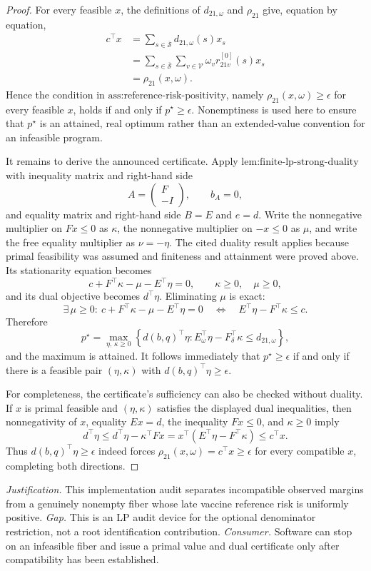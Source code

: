 \documentclass{article}
\begin{document}
\begin{proof}
For every feasible \(x\), the definitions of \(d_{21,\omega}\) and \(\rho_{21}\) give, equation by equation,
\[
 \begin{aligned}
 c^\top x
 &=\sum_{s\in\overline{\mathcal S}}d_{21,\omega}(s)x_s\\
 &=\sum_{s\in\overline{\mathcal S}}\sum_{v\in\mathcal V}
      \omega_v r^{[0]}_{21v}(s)x_s\\
 &=\rho_{21}(x,\omega).
 \end{aligned}
\]
Hence the condition in \(\text{ass:reference-risk-positivity}\), namely
\(\rho_{21}(x,\omega)\geq\epsilon\) for every feasible \(x\), holds if and only if \(p^\star\geq\epsilon\).  Nonemptiness is used here to ensure that \(p^\star\) is an attained, real optimum rather than an extended-value convention for an infeasible program.

It remains to derive the announced certificate.  Apply \(\text{lem:finite-lp-strong-duality}\) with inequality matrix and right-hand side
\[
 A=\begin{pmatrix}F\\-I\end{pmatrix},\qquad b_A=0,
\]
and equality matrix and right-hand side \(B=E\) and \(e=d\).  Write the nonnegative multiplier on \(Fx\leq0\) as \(\kappa\), the nonnegative multiplier on \(-x\leq0\) as \(\mu\), and write the free equality multiplier as \(\nu=-\eta\).  The cited duality result applies because primal feasibility was assumed and finiteness and attainment were proved above.  Its stationarity equation becomes
\[
 c+F^\top\kappa-\mu-E^\top\eta=0,
 \qquad \kappa\geq0,\quad \mu\geq0,
\]
and its dual objective becomes \(d^\top\eta\).  Eliminating \(\mu\) is exact:
\[
 \exists\,\mu\geq0:\ c+F^\top\kappa-\mu-E^\top\eta=0
 \quad\Longleftrightarrow\quad
 E^\top\eta-F^\top\kappa\leq c.
\]
Therefore
\[
 p^\star
 =\max_{\eta,\,\kappa\geq0}
 \left\{d(b,q)^\top\eta:
 E_\omega^\top\eta-F_\delta^\top\kappa\leq d_{21,\omega}\right\},
\]
and the maximum is attained.  It follows immediately that \(p^\star\geq\epsilon\) if and only if there is a feasible pair \((\eta,\kappa)\) with \(d(b,q)^\top\eta\geq\epsilon\).

For completeness, the certificate's sufficiency can also be checked without duality.  If \(x\) is primal feasible and \((\eta,\kappa)\) satisfies the displayed dual inequalities, then nonnegativity of \(x\), equality \(Ex=d\), the inequality \(Fx\leq0\), and \(\kappa\geq0\) imply
\[
 d^\top\eta
 \leq d^\top\eta-\kappa^\top Fx
 =x^\top(E^\top\eta-F^\top\kappa)
 \leq c^\top x.
\]
Thus \(d(b,q)^\top\eta\geq\epsilon\) indeed forces \(\rho_{21}(x,\omega)=c^\top x\geq\epsilon\) for every compatible \(x\), completing both directions.
\end{proof}
\par\smallskip\noindent \textit{Justification.} This implementation audit separates incompatible observed margins from a genuinely nonempty fiber whose late vaccine reference risk is uniformly positive. \textit{Gap.} This is an LP audit device for the optional denominator restriction, not a root identification contribution. \textit{Consumer.} Software can stop on an infeasible fiber and issue a primal value and dual certificate only after compatibility has been established.
\end{document}
